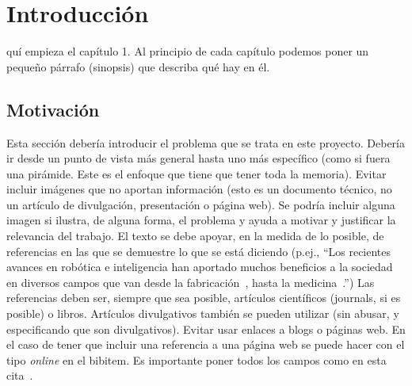 \documentclass[a4paper,11pt,reqno,twoside]{memoir}
\begin{document}


\frontmatter
{}


%
%

\clearemptydoublepage
%

\clearemptydoublepage
%

\clearemptydoublepage
%

\clearemptydoublepage
%

\clearemptydoublepage
%

\clearemptydoublepage
%

\dominitoc
{\sffamily\tableofcontents*}
\clearemptydoublepage
%
{\sffamily\listoffigures}\mtcaddchapter
\clearemptydoublepage
%
{\sffamily\listoftables}\mtcaddchapter
\clearpage


%
%
\mainmatter

\chapter{Introducción}
\label{cap:introduccion}
\minitoc
\vspace{1cm}
quí empieza el capítulo 1. Al principio de cada capítulo podemos poner un pequeño párrafo (sinopsis) que describa qué hay en él.
\newpage

\section{Motivación}
\label{sec:motivacion}

Esta sección debería introducir el problema que se trata en este proyecto. Debería ir desde un punto de vista más general hasta uno más específico (como si fuera una pirámide. Este es el enfoque que tiene que tener toda la memoria). Evitar incluir imágenes que no aportan información (esto es un documento técnico, no un artículo de divulgación, presentación o página web). Se podría incluir alguna imagen si ilustra, de alguna forma, el problema y ayuda a motivar y justificar la relevancia del trabajo. El texto se debe apoyar, en la medida de lo posible, de referencias en las que se demuestre lo que se está diciendo (p.ej., ``Los recientes avances en robótica e inteligencia han aportado muchos beneficios a la sociedad en diversos campos que van desde la fabricación~\cite{ajoudani2018progress}, hasta la medicina~\cite{malik2019overview}.'') Las referencias deben ser, siempre que sea posible, artículos científicos (journals, si es posible) o libros. Artículos divulgativos también se pueden utilizar (sin abusar, y especificando que son divulgativos). Evitar usar enlaces a blogs o páginas web. En el caso de tener que incluir una referencia a una página web se puede hacer con el tipo \textit{online} en el bibitem. Es importante poner todos los campos como en esta cita~\cite{k_project_uma}.
\end{document}
